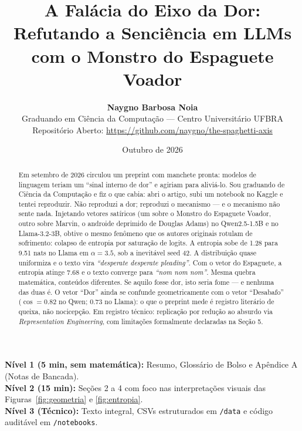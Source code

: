 \documentclass[11pt,a4paper]{article}
\title{\vspace{-0.8cm}\LARGE\textbf{A Falácia do Eixo da Dor: Refutando a Senciência em LLMs com o Monstro do Espaguete Voador}\vspace{-0.3cm}}
\author{\textbf{Naygno Barbosa Noia} \\
\small Graduando em Ciência da Computação --- Centro Universitário UFBRA \\
\small Repositório Aberto: \url{https://github.com/naygno/the-spaghetti-axis}}
\date{\small Outubro de 2026\vspace{-0.4cm}}
\begin{document}
\maketitle

\begin{tcolorbox}[title=Estrutura de Leitura do Repositório]
\footnotesize
\textbf{Nível 1 (5 min, sem matemática):} Resumo, Glossário de Bolso e Apêndice A (Notas de Bancada).\\
\textbf{Nível 2 (15 min):} Seções 2 a 4 com foco nas interpretações visuais das Figuras~\ref{fig:geometria} e \ref{fig:entropia}.\\
\textbf{Nível 3 (Técnico):} Texto integral, CSVs estruturados em \texttt{/data} e código auditável em \texttt{/notebooks}.
\end{tcolorbox}

\vspace{-0.2cm}
\begin{abstract}
\footnotesize
Em setembro de 2026 circulou um preprint com manchete pronta: modelos de linguagem teriam um ``sinal interno de dor'' e agiriam para aliviá-lo. Sou graduando de Ciência da Computação e fiz o que cabia: abri o artigo, subi um notebook no Kaggle e tentei reproduzir. Não reproduzi a dor; reproduzi o mecanismo --- e o mecanismo não sente nada. Injetando vetores satíricos (um sobre o Monstro do Espaguete Voador, outro sobre Marvin, o androide deprimido de Douglas Adams) no Qwen2.5-1.5B e no Llama-3.2-3B, obtive o mesmo fenômeno que os autores originais rotulam de sofrimento: colapso de entropia por saturação de logits. A entropia sobe de 1.28 para 9.51 nats no Llama em $\alpha = 3.5$, sob a inevitável seed 42. A distribuição quase uniformiza e o texto vira \textit{``desperate desperate pleading''}. Com o vetor do Espaguete, a entropia atinge 7.68 e o texto converge para \textit{``nom nom nom''}. Mesma quebra matemática, conteúdos diferentes. Se aquilo fosse dor, isto seria fome --- e nenhuma das duas é. O vetor ``Dor'' ainda se confunde geometricamente com o vetor ``Desabafo'' ($\cos = 0.82$ no Qwen; $0.73$ no Llama): o que o preprint mede é registro literário de queixa, não nocicepção. Em registro técnico: replicação por redução ao absurdo via \textit{Representation Engineering}, com limitações formalmente declaradas na Seção 5.
\end{abstract}
\end{document}
